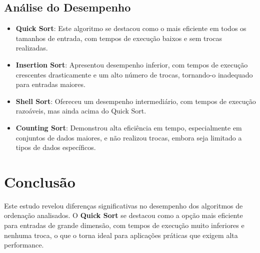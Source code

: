 \documentclass{article}
\begin{document}
\subsection{Análise do Desempenho}
\begin{itemize}
    \item \textbf{Quick Sort}: Este algoritmo se destacou como o mais eficiente em todos os tamanhos de entrada, com tempos de execução baixos e sem trocas realizadas.
    \item \textbf{Insertion Sort}: Apresentou desempenho inferior, com tempos de execução crescentes drasticamente e um alto número de trocas, tornando-o inadequado para entradas maiores.
    \item \textbf{Shell Sort}: Ofereceu um desempenho intermediário, com tempos de execução razoáveis, mas ainda acima do Quick Sort.
    \item \textbf{Counting Sort}: Demonstrou alta eficiência em tempo, especialmente em conjuntos de dados maiores, e não realizou trocas, embora seja limitado a tipos de dados específicos.
\end{itemize}

\section{Conclusão}
Este estudo revelou diferenças significativas no desempenho dos algoritmos de ordenação analisados. O \textbf{Quick Sort} se destacou como a opção mais eficiente para entradas de grande dimensão, com tempos de execução muito inferiores e nenhuma troca, o que o torna ideal para aplicações práticas que exigem alta performance.
\end{document}
